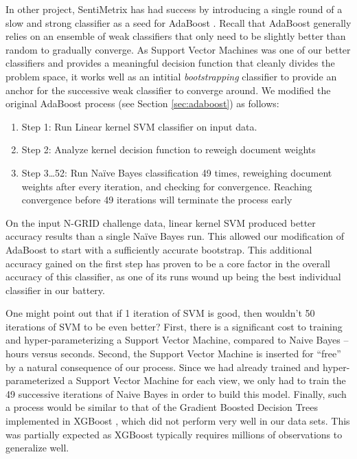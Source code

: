 In other project, SentiMetrix has had success by introducing a single round of a slow and strong classifier as a seed for AdaBoost \cite{darpa}. Recall that AdaBoost generally relies on an ensemble of weak classifiers that only need to be slightly better than random to gradually converge. As Support Vector Machines was one of our better classifiers and provides a meaningful decision function that cleanly divides the problem space, it works well as an intitial \textit{bootstrapping} classifier to provide an anchor for the successive weak classifier to converge around. We modified the original AdaBoost process (see Section \ref{sec:adaboost}) as follows:

\begin{enumerate}
    \item \textsf{Step 1:} Run Linear kernel SVM classifier on input data. 
    \item \textsf{Step 2:} Analyze kernel decision function to reweigh document weights
    \item \textsf{Step 3\ldots52:} Run Na\"{i}ve Bayes classification 49 times, reweighing document weights after every iteration, and checking for convergence. Reaching convergence before 49 iterations will terminate the process early
\end{enumerate}

On the input N-GRID challenge data, linear kernel SVM produced better accuracy results than a single Na\"{i}ve Bayes run. This allowed our modification of AdaBoost to start with a sufficiently accurate bootstrap. This additional accuracy gained on the first step has proven to be  a core factor in the overall accuracy of this classifier, as one of its runs wound up being the best individual classifier in our battery.

One might point out that if 1 iteration of SVM is good, then wouldn't 50 iterations of SVM to be even better? First, there is a significant cost to training and hyper-parameterizing a Support Vector Machine, compared to Naive Bayes -- hours versus seconds. Second, the Support Vector Machine is inserted for ``free'' by a natural consequence of our process. Since we had already trained and hyper-parameterized a Support Vector Machine for each view, we only had to train the 49 successive iterations of Naive Bayes in order to build this model. Finally, such a process would be similar to that of the Gradient Boosted Decision Trees implemented in XGBoost \cite{xgboost}, which did not perform very well in our data sets. This was partially expected as XGBoost typically requires millions of observations to generalize well.


